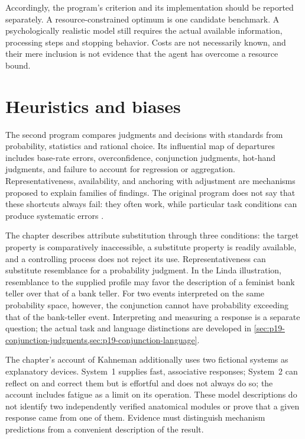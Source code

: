 Accordingly, the program's criterion and its implementation should be
reported separately. A resource-constrained optimum is one candidate
benchmark. A psychologically realistic model still requires the actual
available information, processing steps and stopping behavior. Costs
are not necessarily known, and their mere inclusion is not evidence that
the agent has overcome a resource bound.

\section{Heuristics and biases}
\label{sec:p17-br-heuristics-biases}

The second program compares judgments and decisions with standards from
probability, statistics and rational choice. Its influential map of
departures includes base-rate errors, overconfidence, conjunction
judgments, hot-hand judgments, and failure to account for regression
or aggregation. Representativeness, availability, and anchoring with
adjustment are mechanisms proposed to explain families of findings.
The original program does not say that these shortcuts always fail:
they often work, while particular task conditions can produce systematic
errors \cite[pp.~509--510]{HertwigKozyreva2021Bounded}.

The chapter describes attribute substitution through three conditions:
the target property is comparatively inaccessible, a substitute property
is readily available, and a controlling process does not reject its use.
Representativeness can substitute resemblance for a probability judgment.
In the Linda illustration, resemblance to the supplied profile may favor
the description of a feminist bank teller over that of a bank teller.
For two events interpreted on the same probability space, however,
the conjunction cannot have probability exceeding that of the bank-teller
event. Interpreting and measuring a response is a separate question;
the actual task and language distinctions are developed in
\cref{sec:p19-conjunction-judgments,sec:p19-conjunction-language}.

The chapter's account of Kahneman additionally uses two fictional systems
as explanatory devices. System~1 supplies fast, associative responses;
System~2 can reflect on and correct them but is effortful and does not
always do so; the account includes fatigue as a limit on its operation.
These model descriptions do not identify two independently
verified anatomical modules or prove that a given response came from one
of them. Evidence must distinguish mechanism predictions from a convenient
description of the result.

